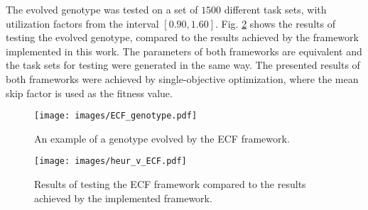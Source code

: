 The evolved genotype was tested on a set of $1500$ different task sets, with utilization factors from the interval $[0.90, 1.60]$.
Fig. \ref{ecf_v_heur} shows the results of testing the evolved genotype, compared to the results achieved by the framework implemented in this work.
The parameters of both frameworks are equivalent and the task sets for testing were generated in the same way.
The presented results of both frameworks were achieved by single-objective optimization, where the mean skip factor is used as the fitness value.
\begin{figure}[H]
    \centering
    \texttt{[image: images/ECF\_genotype.pdf]}
    \caption{An example of a genotype evolved by the ECF framework.}
    \label{ECF_genotype}
\end{figure}
\begin{figure}[H]
    \centering
    \texttt{[image: images/heur\_v\_ECF.pdf]}
    \caption{Results of testing the ECF framework compared to the results achieved by the implemented framework.}
    \label{ecf_v_heur}
\end{figure}

